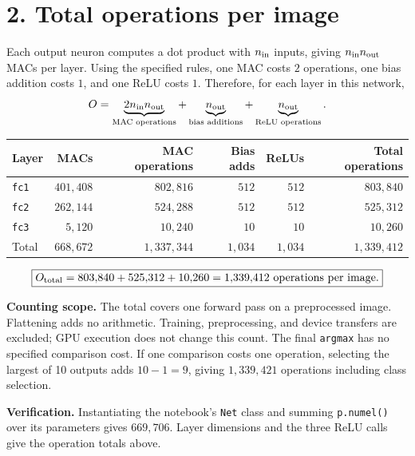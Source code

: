 \documentclass[10pt]{article}
\begin{document}
\section*{2. Total operations per image}
Each output neuron computes a dot product with $n_{\rm in}$ inputs,
giving $n_{\rm in}n_{\rm out}$ MACs per layer. Using the specified rules,
one MAC costs $2$ operations, one bias addition costs $1$, and one ReLU
costs $1$. Therefore, for each layer in this network,
\[
O=\underbrace{2n_{\rm in}n_{\rm out}}_{\text{MAC operations}}
  +\underbrace{n_{\rm out}}_{\text{bias additions}}
  +\underbrace{n_{\rm out}}_{\text{ReLU operations}}.
\]
\begin{center}
\begin{tabular}{lrrrrr}
\toprule
Layer & MACs & MAC operations & Bias adds & ReLUs & Total operations\\
\midrule
\texttt{fc1} & $401{,}408$ & $802{,}816$ & $512$ & $512$ & $803{,}840$\\
\texttt{fc2} & $262{,}144$ & $524{,}288$ & $512$ & $512$ & $525{,}312$\\
\texttt{fc3} & $5{,}120$ & $10{,}240$ & $10$ & $10$ & $10{,}260$\\
\midrule
Total & $668{,}672$ & $1{,}337{,}344$ & $1{,}034$ & $1{,}034$ & $1{,}339{,}412$\\
\bottomrule
\end{tabular}
\end{center}
\[
\boxed{O_{\rm total}=803{,}840+525{,}312+10{,}260
 =1{,}339{,}412\text{ operations per image}.}
\]

\textbf{Counting scope.} The total covers one forward pass on a preprocessed
image. Flattening adds no arithmetic. Training, preprocessing, and device
transfers are excluded; GPU execution does not change this count.
The final \texttt{argmax} has no specified comparison cost. If one comparison
costs one operation, selecting the largest of 10 outputs adds $10-1=9$,
giving $1{,}339{,}421$ operations including class selection.

\textbf{Verification.} Instantiating the notebook's \texttt{Net} class and
summing \texttt{p.numel()} over its parameters gives $669{,}706$.
Layer dimensions and the three ReLU calls give the operation totals above.
\end{document}
